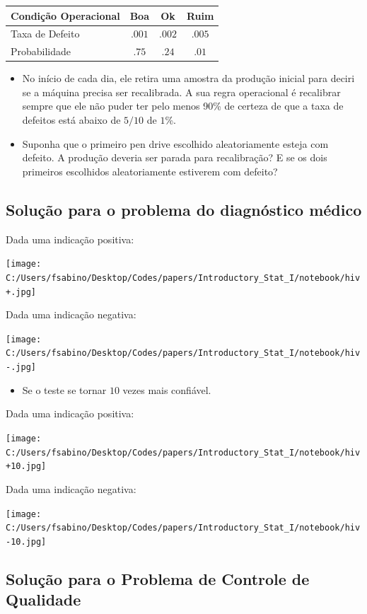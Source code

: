 \documentclass[]{article}
\providecommand{\tightlist}{%
  \setlength{\itemsep}{0pt}\setlength{\parskip}{0pt}}
\begin{document}
\begin{longtable}[]{@{}lccc@{}}
\toprule
Condição Operacional & Boa & Ok & Ruim\tabularnewline
\midrule
\endhead
Taxa de Defeito & \(.001\) & \(.002\) & \(.005\)\tabularnewline
Probabilidade & \(.75\) & \(.24\) & \(.01\)\tabularnewline
\bottomrule
\end{longtable}

\begin{itemize}
\item
  No início de cada dia, ele retira uma amostra da produção inicial para
  deciri se a máquina precisa ser recalibrada. A sua regra operacional é
  recalibrar sempre que ele não puder ter pelo menos 90\% de certeza de
  que a taxa de defeitos está abaixo de \(5/10\) de \(1\)\%.
\item
  Suponha que o primeiro pen drive escolhido aleatoriamente esteja com
  defeito. A produção deveria ser parada para recalibração? E se os dois
  primeiros escolhidos aleatoriamente estiverem com defeito?
\end{itemize}

\subsection{Solução para o problema do diagnóstico
médico}\label{solucao-para-o-problema-do-diagnostico-medico}

Dada uma indicação positiva:

\texttt{[image: C:/Users/fsabino/Desktop/Codes/papers/Introductory\_Stat\_I/notebook/hiv+.jpg]}

Dada uma indicação negativa:

\texttt{[image: C:/Users/fsabino/Desktop/Codes/papers/Introductory\_Stat\_I/notebook/hiv-.jpg]}

\begin{itemize}
\tightlist
\item
  Se o teste se tornar \(10\) vezes mais confiável.
\end{itemize}

Dada uma indicação positiva:

\texttt{[image: C:/Users/fsabino/Desktop/Codes/papers/Introductory\_Stat\_I/notebook/hiv+10.jpg]}

Dada uma indicação negativa:

\texttt{[image: C:/Users/fsabino/Desktop/Codes/papers/Introductory\_Stat\_I/notebook/hiv-10.jpg]}

\subsection{Solução para o Problema de Controle de
Qualidade}\label{solucao-para-o-problema-de-controle-de-qualidade}
\end{document}
